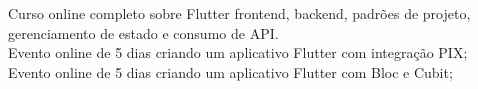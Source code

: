 \documentclass[
    10pt,
    english,
]{article}
\begin{document}
{}
{Curso online completo sobre Flutter frontend, backend, padrões de projeto, gerenciamento de estado e consumo de API.}
\\
\noindent {}
{Evento online de 5 dias criando um aplicativo Flutter com integração PIX;}
\\
\noindent {}
{Evento online de 5 dias criando um aplicativo Flutter com Bloc e Cubit;}

\end{document}
